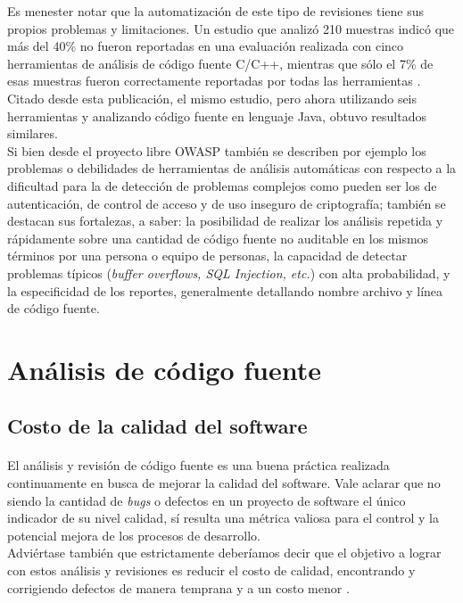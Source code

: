 \documentclass[11pt,a4paper]{article}
\begin{document}
Es menester notar que la automatización de este tipo de revisiones tiene sus propios problemas y limitaciones. Un estudio que analizó 210 muestras indicó que más del 40\% no fueron reportadas en una evaluación realizada con cinco herramientas de análisis de código fuente C/C++, mientras que sólo el 7\% de esas muestras fueron correctamente reportadas por todas las herramientas \cite{sei1}. Citado desde esta publicación, el mismo estudio, pero ahora utilizando seis herramientas y analizando código fuente en lenguaje Java, obtuvo resultados similares.
\\
Si bien desde el proyecto libre OWASP \cite{owa1} también se describen por ejemplo los problemas o debilidades de herramientas de análisis automáticas con respecto a la dificultad para la de detección de problemas complejos como pueden ser los de autenticación, de control de acceso y de uso inseguro de criptografía; también se destacan sus fortalezas, a saber: la posibilidad de realizar los análisis repetida y rápidamente sobre una cantidad de código fuente no auditable en los mismos términos por una persona o equipo de personas, la capacidad de detectar problemas típicos (\textit{buffer overflows, SQL Injection, etc.}) con alta probabilidad, y la especificidad de los reportes, generalmente detallando nombre archivo y línea de código fuente.
\\

\section{Análisis de código fuente}

\subsection{Costo de la calidad del software}

\paragraph{}El análisis y revisión de código fuente es una buena práctica realizada continuamente en busca de mejorar la calidad del software. Vale aclarar que no siendo la cantidad de \textit{bugs} o defectos en un proyecto de software el único indicador de su nivel calidad, sí resulta una métrica valiosa para el control y la potencial mejora de los procesos de desarrollo.
\\
Adviértase también que estrictamente deberíamos decir que el objetivo a lograr con estos análisis y revisiones es reducir el costo de calidad, encontrando y corrigiendo defectos de manera temprana y a un costo menor \cite{Rad1}.
\\
\end{document}
